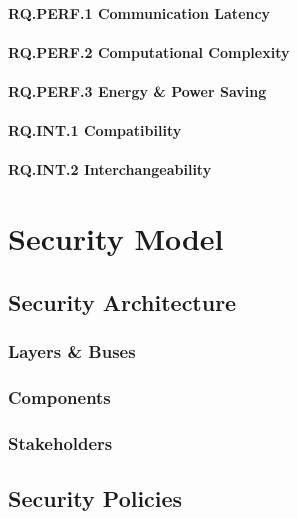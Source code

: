 \paragraph{RQ.PERF.1 Communication Latency}
\paragraph{RQ.PERF.2 Computational Complexity}
\paragraph{RQ.PERF.3 Energy \& Power Saving}

\paragraph{RQ.INT.1 Compatibility}
\paragraph{RQ.INT.2 Interchangeability}

\section{Security Model}
\label{sec:approach:security_model}
\subsection{Security Architecture}
\subsubsection{Layers \& Buses}
\subsubsection{Components}
\subsubsection{Stakeholders}

\subsection{Security Policies}

